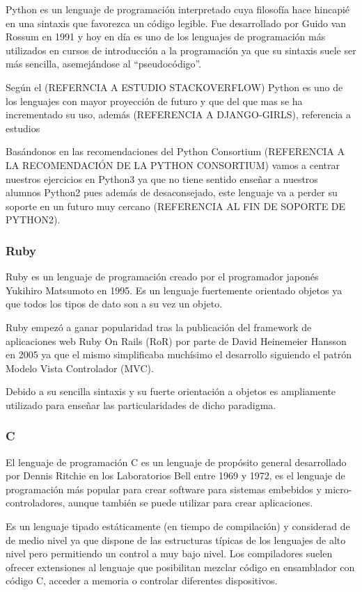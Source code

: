 Python es un lenguaje de programación interpretado cuya filosofía hace hincapié en una sintaxis que favorezca un código legible. Fue desarrollado por Guido van Rossum en 1991 y hoy en día es uno de los lenguajes de programación más utilizados en cursos de introducción a la programación ya que su sintaxis suele ser más sencilla, asemejándose al ``pseudocódigo''.

Según el (REFERNCIA A ESTUDIO STACKOVERFLOW) Python es uno de los lenguajes con mayor proyección de futuro y que del que mas se ha incrementado su uso, además (REFERENCIA A DJANGO-GIRLS), referencia a estudios

Basándonos en las recomendaciones del Python Consortium (REFERENCIA A LA RECOMENDACIÓN DE LA PYTHON CONSORTIUM) vamos a centrar nuestros ejercicios en Python3 ya que no tiene sentido enseñar a nuestros alumnos Python2 pues además de desaconsejado, este lenguaje va a perder su soporte en un futuro muy cercano (REFERENCIA AL FIN DE SOPORTE DE PYTHON2).

\subsubsection{Ruby}

Ruby es un lenguaje de programación creado por el programador japonés Yukihiro Matsumoto en 1995. Es un lenguaje fuertemente orientado objetos ya que todos los tipos de dato son a su vez un objeto.

\bigskip
Ruby empezó a ganar popularidad tras la publicación del framework de aplicaciones web Ruby On Rails (RoR) por parte de David Heinemeier Hansson en 2005 ya que el mismo simplificaba muchísimo el desarrollo siguiendo el patrón Modelo Vista Controlador (MVC).

\bigskip
Debido a su sencilla sintaxis y su fuerte orientación a objetos es ampliamente utilizado para enseñar las particularidades de dicho paradigma.

\subsubsection{C}

El lenguaje de programación C es un lenguaje de propósito general desarrollado por Dennis Ritchie en los Laboratorios Bell entre 1969 y 1972, es el lenguaje de programación más popular para crear software para sistemas embebidos y micro-controladores, aunque también se puede utilizar para crear aplicaciones.

\bigskip
Es un lenguaje tipado estáticamente (en tiempo de compilación) y considerad de de medio nivel ya que dispone de las estructuras típicas de los lenguajes de alto nivel pero permitiendo un control a muy bajo nivel. Los compiladores suelen ofrecer extensiones al lenguaje que posibilitan mezclar código en ensamblador con código C, acceder a memoria o controlar diferentes dispositivos.

